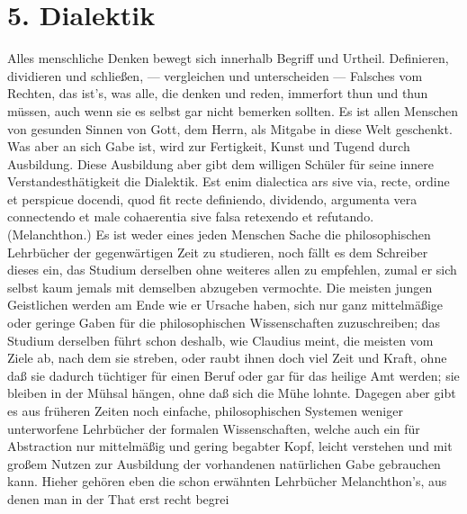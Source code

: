 \section{5. Dialektik}

Alles menschliche Denken bewegt sich innerhalb Begriff und Urtheil. Definieren, dividieren und schließen, — vergleichen und unterscheiden — Falsches vom Rechten, das ist’s, was alle, die denken und reden, immerfort thun und thun müssen, auch wenn sie es selbst gar nicht bemerken sollten. Es ist allen Menschen von gesunden Sinnen von Gott, dem Herrn, als
Mitgabe in diese Welt geschenkt. Was aber an sich Gabe ist, wird zur Fertigkeit, Kunst und Tugend durch Ausbildung. Diese Ausbildung aber gibt dem willigen Schüler für seine innere Verstandesthätigkeit die Dialektik. Est enim dialectica ars sive via, recte, ordine et perspicue docendi, quod fit recte definiendo, dividendo, argumenta vera connectendo et male cohaerentia sive falsa retexendo et refutando. (Melanchthon.) Es ist weder eines jeden Menschen Sache die philosophischen Lehrbücher der gegenwärtigen Zeit zu studieren, noch fällt es dem Schreiber dieses ein, das Studium derselben ohne weiteres allen zu empfehlen, zumal er sich selbst kaum jemals mit demselben abzugeben vermochte. Die meisten jungen Geistlichen werden am Ende wie er Ursache haben, sich nur ganz mittelmäßige oder geringe Gaben für die philosophischen Wissenschaften zuzuschreiben; das Studium derselben führt schon deshalb, wie Claudius meint, die meisten vom Ziele ab, nach dem sie streben, oder raubt ihnen doch viel Zeit und Kraft, ohne daß sie dadurch tüchtiger für einen Beruf oder gar für das heilige Amt werden; sie bleiben in der Mühsal hängen, ohne daß sich die Mühe lohnte. Dagegen aber gibt es aus früheren Zeiten noch einfache, philosophischen Systemen weniger unterworfene Lehrbücher der formalen Wissenschaften, welche auch ein für Abstraction nur mittelmäßig und gering begabter Kopf, leicht verstehen und mit großem Nutzen zur Ausbildung der vorhandenen natürlichen Gabe gebrauchen kann. Hieher gehören eben die schon erwähnten Lehrbücher Melanchthon’s, aus denen man in der That erst recht begrei%
